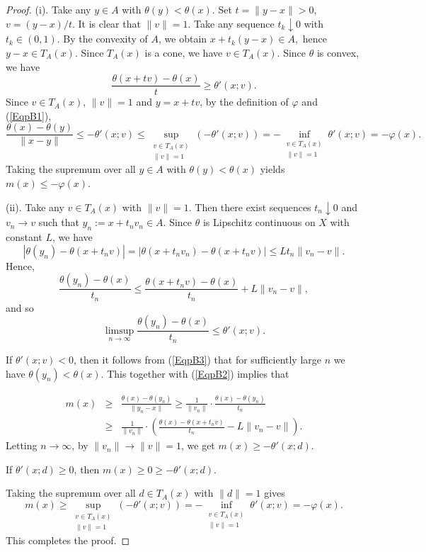 \documentclass[11pt]{article}
\begin{document}
\begin{proof} 	(i).  Take any \(y\in A\) with \(\theta(y)<\theta(x)\). Set \(t=\|y-x\|>0\), \(v=(y-x)/t\).  It is clear that \(\|v\|=1\).
Take any sequence  $t_k \downarrow0$ with \( t_k \in (0,1) \).   By the convexity of \(A\),   we obtain
$	x + t_k (y - x) \in A, $	hence  $y - x \in T_A(x).$
Since \( T_A(x)\) is a cone, we have
$	v  \in  {T}_A(x).  $
Since \(\theta\) is convex, we have
\begin{equation}\label{EqpB1}
	\frac{\theta(x+tv)-\theta(x)}{t}\ge \theta'(x;v).
\end{equation}
Since \(v\in T_A(x)\), \(\|v\|=1\)  and  $y= x+tv$, by the definition of \(\varphi\) and (\ref{EqpB1}),
\[
\frac{\theta(x)-\theta(y)}{\|x-y\|}\le -\theta'(x;v)\le \sup_{\substack{v\in T_A(x)\\\|v\|=1}}(-\theta'(x;v))
=-\inf_{\substack{v\in T_A(x)\\\|v\|=1}}\theta'(x;v)=-\varphi(x).
\]
Taking the supremum over all \(y\in A\) with \(\theta(y)<\theta(x)\) yields \(m(x)\le -\varphi(x)\).

(ii).    Take any \(v\in T_A(x)\) with \(\|v\|=1\). 
Then there exist sequences $t_n  \downarrow 0$ and $v_n \to v$ such that $y_n :=  x + t_n v_n \in A$.
Since  $\theta$ is   Lipschitz continuous on $X$ with constant $L$,  we have 
\[
|\theta(y_n)-\theta(x+t_n v)|  =    |\theta(x+t_n v_n)-\theta(x+t_n v)|\le Lt_n\|v_n-v\|.
\]
Hence,
\begin{equation}\label{EqpB2}
	\frac{\theta(y_n)-\theta(x)}{t_n}
	\leq    \frac{\theta(x+t_n v)-\theta(x)}{t_n}+ L \|v_n-v\|, 
\end{equation}
and so 
\begin{equation}\label{EqpB3}  
	\limsup_{n \to\infty}   \frac{\theta(y_n)-\theta(x)}{t_n}   \leq  \theta'(x;v). 
\end{equation}

If \(\theta'(x;v)<0\), then  it follows from  (\ref{EqpB3})  that for sufficiently large \(n\) we have \(\theta(y_n)<\theta(x)\). This together with  (\ref{EqpB2})    implies that 

\begin{eqnarray*}
	m(x) &\ge& \frac{\theta(x)-\theta(y_n)}{\|y_n-x\|}
	\ge \frac{1}{\|v_n\|} \cdot  \frac{\theta(x)-   \theta(y_n)}{t_n} \\
	&\ge&   \frac{1}{\|v_n\|} \cdot \left( \frac{\theta(x)  -  \theta(x+t_n v)}{t_n}   - L \|v_n-v\| \right) .
\end{eqnarray*}
Letting $n\to\infty$, 
by $   \|v_n \|  \to  \|v\|=1$, we get   $m(x)\ge  -\theta'(x;d).$

If \(\theta'(x;d)\ge0\), then \(  m(x)  \ge 0  \ge -\theta'(x;d) \).

Taking the supremum over all \(d\in T_A(x)\) with \(\|d\|=1\) gives 
$$    m(x)\ge  \sup_{\substack{v\in T_A(x)\\\|v\|=1}}(-\theta'(x;v))
=-\inf_{\substack{v\in T_A(x)\\\|v\|=1}}\theta'(x;v)=-\varphi(x).$$
This completes the proof.    \end{proof} 
\end{document}
